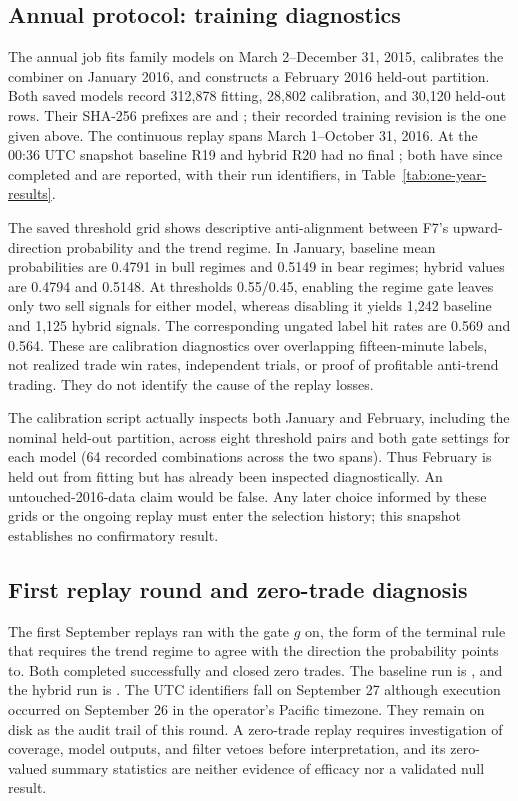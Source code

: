 \subsection{Annual protocol: training diagnostics} \label{subsec:intermediate-annual}

The annual job fits family models on March 2--December 31, 2015, calibrates the combiner on January 2016, and constructs a February 2016 held-out partition. Both saved models record 312,878 fitting, 28,802 calibration, and 30,120 held-out rows. Their SHA-256 prefixes are  and ; their recorded training revision is the one given above. The continuous replay spans March 1--October 31, 2016. At the 00:36 UTC snapshot baseline R19 and hybrid R20 had no final ; both have since completed and are reported, with their run identifiers, in Table~\ref{tab:one-year-results}.

The saved threshold grid shows descriptive anti-alignment between F7's upward-direction probability and the trend regime. In January, baseline mean probabilities are 0.4791 in bull regimes and 0.5149 in bear regimes; hybrid values are 0.4794 and 0.5148. At thresholds 0.55/0.45, enabling the regime gate leaves only two sell signals for either model, whereas disabling it yields 1,242 baseline and 1,125 hybrid signals. The corresponding ungated label hit rates are 0.569 and 0.564. These are calibration diagnostics over overlapping fifteen-minute labels, not realized trade win rates, independent trials, or proof of profitable anti-trend trading. They do not identify the cause of the replay losses.

The calibration script actually inspects both January and February, including the nominal held-out partition, across eight threshold pairs and both gate settings for each model (64 recorded combinations across the two spans). Thus February is held out from fitting but has already been inspected diagnostically. An untouched-2016-data claim would be false. Any later choice informed by these grids or the ongoing replay must enter the selection history; this snapshot establishes no confirmatory result.

\subsection{First replay round and zero-trade diagnosis} \label{subsec:zero-trade}

The first September replays ran with the gate $g$ on, the form of the terminal rule that requires the trend regime to agree with the direction the probability points to. Both completed successfully and closed zero trades. The baseline run is , and the hybrid run is . The UTC identifiers fall on September 27 although execution occurred on September 26 in the operator's Pacific timezone. They remain on disk as the audit trail of this round. A zero-trade replay requires investigation of coverage, model outputs, and filter vetoes before interpretation, and its zero-valued summary statistics are neither evidence of efficacy nor a validated null result.

